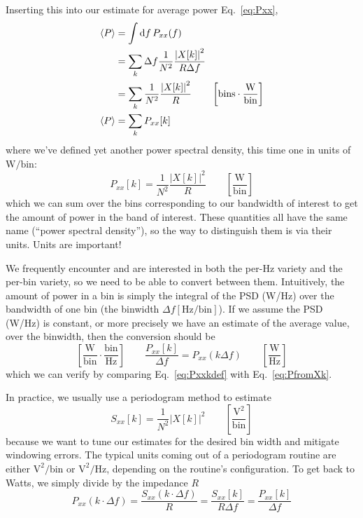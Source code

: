 \documentclass{article}
\newcommand{\dd}[1]{\mathrm{d}#1\,}
\newcommand{\Avg}[1]{\left< #1 \right>}
\begin{document}
Inserting this into our estimate for average power Eq.~\eqref{eq:Pxx},
%
\begin{align}
    \Avg{P} & = \int \dd{f} P_{xx}(f) \notag \\
    & = \sum_k \Delta f \frac{1}{N^2} \frac{\left|X[k]\right|^2}{R\Delta f} \notag \\
    & = \sum_k \frac{1}{N^2} \frac{\left|X[k]\right|^2}{R} \qquad \left[\mathrm{bins \cdot \frac{W}{bin}}\right] \label{eq:PfromXk}\\
    \Avg{P} & = \sum_k P_{xx}[k] \label{eq:Psumoverbins}
\end{align}
%
where we've defined yet another power spectral density, this time one in units of
\(\mathrm{W/bin}\):
%
\begin{equation}
    P_{xx}[k] = \frac{1}{N^2} \frac{\left|X[k]\right|^2}{R} \qquad \left[\mathrm{\frac{W}{bin}}\right]\label{eq:Pxxkdef}
\end{equation}
%
which we can sum over the bins corresponding to our bandwidth of interest to get
the amount of power in the band of interest. These quantities all have the same 
name (``power spectral density''), so the way to distinguish them is via their
units. Units are important!

We frequently encounter and are interested in both the per-Hz variety and the per-bin
variety, so we need to be able to convert between them. Intuitively, the amount of
power in a bin is simply the integral of the PSD (W/Hz) over the bandwidth of one
bin (the binwidth \(\Delta f \left[\mathrm{Hz/bin}\right]\)). If we assume the PSD (W/Hz) is constant, or more
precisely we have an estimate of the average value, over the binwidth, then the
conversion should be
%
\begin{equation}
    \left[\mathrm{\frac{W}{bin}\cdot \frac{bin}{Hz}}\right] \qquad \frac{P_{xx}[k]}{\Delta f} = P_{xx} (k\Delta f) \qquad \left[\mathrm{\frac{W}{Hz}}\right] \label{eq:Pxxkconversion}
\end{equation}
%
which we can verify by comparing Eq.~\eqref{eq:Pxxkdef} with Eq.~\eqref{eq:PfromXk}.

In practice, we usually use a periodogram method to estimate
%
\begin{equation}
    S_{xx}[k] = \frac{1}{N^2}\left|X[k]\right|^2 \qquad \left[\mathrm{\frac{V^2}{bin}}\right] \label{eq:Sxxperbin}
\end{equation}
%
because we want to tune our estimates for the desired bin width and mitigate
windowing errors. The typical units coming out of a periodogram routine are either
\(\mathrm{V^2/bin}\) or \(\mathrm{V^2/Hz}\), depending on the routine's configuration.
To get back to Watts, we simply divide by the impedance \(R\)
%
\begin{equation}
    P_{xx}(k\cdot\Delta f) = \frac{S_{xx}(k\cdot\Delta f)}{R} = \frac{S_{xx}[k]}{R\Delta f} = \frac{P_{xx}[k]}{\Delta f}
\end{equation}
\end{document}
